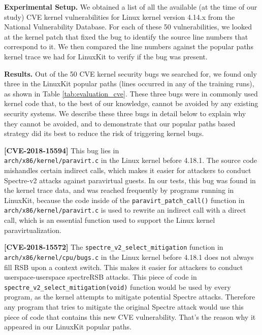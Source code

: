 \textbf{Experimental Setup.}
We obtained a list of all the available (at the time of our study) CVE kernel vulnerabilities for Linux kernel version 4.14.x from the National Vulnerability Database. 
For each of these 50 vulnerabilities, we looked at the kernel patch that fixed the bug to identify the source line numbers that correspond to it. 
We then compared the line numbers against the popular paths kernel trace we had for LinuxKit to verify if the bug was present.

\textbf{Results.}
Out of the 50 CVE kernel security bugs we searched for, we found only three in the LinuxKit popular paths (lines occurred in any of the training runs), 
as shown in Table \ref{tab:evaluation_cve}. 
These three bugs were in commonly used kernel code that,   to the best of our knowledge, cannot be avoided by any existing security systems. 
We describe these three bugs in detail below to explain why they cannot be avoided, 
and to demonstrate that our popular paths based strategy did its best to reduce the risk of triggering kernel bugs.

\textbf{[CVE-2018-15594]}
This bug lies in \\
\verb|arch/x86/kernel/paravirt.c| in the Linux kernel before 4.18.1. 
The source code mishandles certain indirect calls, which makes it easier for attackers to conduct Spectre-v2 attacks against paravirtual guests. 
In our tests, this bug was found in the kernel trace data, and was reached frequently by programs running in LinuxKit, 
because the code inside of the \verb|paravirt_patch_call()| function in \\
\verb|arch/x86/kernel/paravirt.c| is used to rewrite an indirect call with a direct call, 
which is an essential function used to support the Linux kernel paravirtualization. 

\textbf{[CVE-2018-15572]}
The \verb|spectre_v2_select_mitigation| function in \verb|arch/x86/kernel/cpu/bugs.c| in the Linux kernel before 4.18.1 does not always fill RSB upon a context switch. 
This makes it easier for attackers to conduct userspace-userspace spectreRSB attacks. 
This piece of code in \\
\verb|spectre_v2_select_mitigation(void)| function would be used by every program, as the kernel attempts to mitigate potential Spectre attacks. 
Therefore any program that tries to mitigate the original Spectre attack would use this piece of code that contains this new CVE vulnerability. 
That's the reason why it appeared in our LinuxKit popular paths. 

